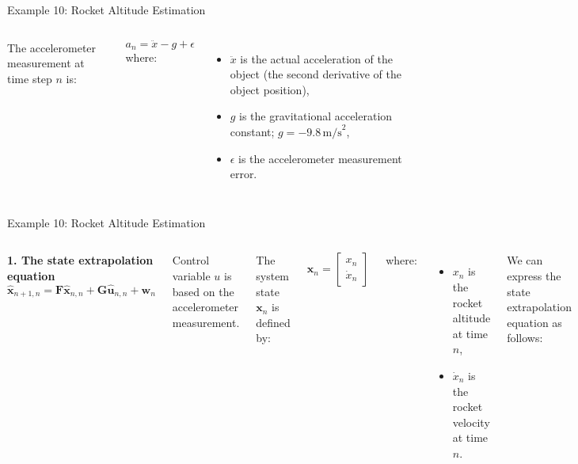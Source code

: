 \begin{frame}{Example 10: Rocket Altitude Estimation}
\begin{columns}
The accelerometer measurement at time step $n$ is:

\[
a_n = \ddot{x} - g + \epsilon
\]
where:
\begin{itemize}
    \item \(\ddot{x}\) is the actual acceleration of the object (the second derivative of the object position),
    \item \(g\) is the gravitational acceleration constant; \(g = -9.8 \, \text{m/s}^2\),
    \item \(\epsilon\) is the accelerometer measurement error.
\end{itemize}
\end{columns}
\end{frame}


\begin{frame}{Example 10: Rocket Altitude Estimation}
\begin{columns}
\textbf{1. The state extrapolation equation}
        \begin{equation*}
        \hat{\mathbf{x}}_{n+1,n} = \mathbf{F} \hat{\mathbf{x}}_{n,n} + \mathbf{G}\hat{\mathbf{u}}_{n,n} + \mathbf{w}_{n}
        \end{equation*}

Control variable $u$ is based on the accelerometer measurement.

The system state \(\mathbf{x}_n\) is defined by:

\[
\mathbf{x}_n =
\begin{bmatrix}
x_n \\
\dot{x}_n
\end{bmatrix}
\]

where:
\begin{itemize}
    \item \(x_n\) is the rocket altitude at time \(n\),
    \item \(\dot{x}_n\) is the rocket velocity at time \(n\).
\end{itemize}

We can express the state extrapolation equation as follows:

\[
\begin{bmatrix}
\hat{x}_{n+1,n} \\
\hat{\dot{x}}_{n+1,n}
\end{bmatrix}
=
\begin{bmatrix}
1 & \Delta t \\
0 & 1
\end{bmatrix}
\begin{bmatrix}
\hat{x}_{n,n} \\
\hat{\dot{x}}_{n,n}
\end{bmatrix}
+
\begin{bmatrix}
0.5 \Delta t^2 \\
\Delta t
\end{bmatrix}
(a_n + g)
\]


\end{columns}
\end{frame}
